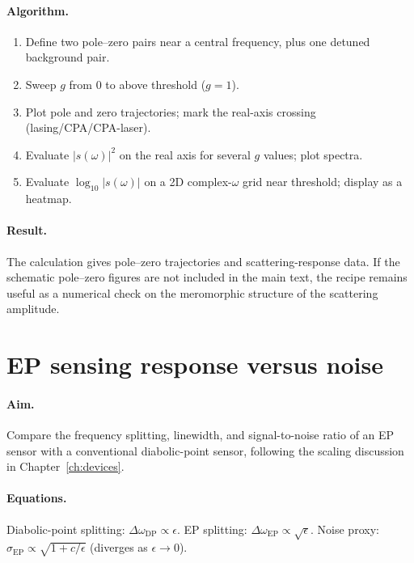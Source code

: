 \paragraph{Algorithm.}
\begin{enumerate}
 \item Define two pole--zero pairs near a central frequency, plus one
 detuned background pair.
 \item Sweep $g$ from $0$ to above threshold ($g = 1$).
 \item Plot pole and zero trajectories; mark the real-axis crossing
 (lasing/CPA/CPA-laser).
 \item Evaluate $|s(\omega)|^2$ on the real axis for several $g$
 values; plot spectra.
 \item Evaluate $\log_{10}|s(\omega)|$ on a 2D complex-$\omega$ grid
 near threshold; display as a heatmap.
\end{enumerate}

\paragraph{Result.}
The calculation gives pole--zero trajectories and scattering-response
data. If the schematic pole--zero figures are not included in the main
text, the recipe remains useful as a numerical check on the meromorphic
structure of the scattering amplitude.


\section{EP sensing response versus noise}
\label{sec:recipe-ep-sensing}

\paragraph{Aim.}
Compare the frequency splitting, linewidth, and signal-to-noise ratio
of an EP sensor with a conventional diabolic-point sensor, following the
scaling discussion in Chapter~\ref{ch:devices}.

\paragraph{Equations.}
Diabolic-point splitting: $\Delta\omega_{\mathrm{DP}} \propto \epsilon$.
EP splitting: $\Delta\omega_{\mathrm{EP}} \propto \sqrt{\epsilon}$.
Noise proxy: $\sigma_{\mathrm{EP}} \propto \sqrt{1 + c/\epsilon}$
(diverges as $\epsilon \to 0$).

